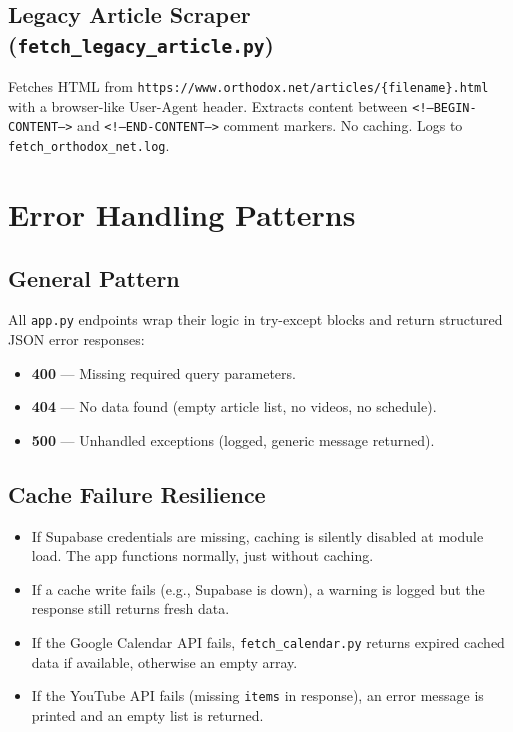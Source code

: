 \documentclass[12pt]{article}
\begin{document}
\subsection{Legacy Article Scraper (\texttt{fetch\_legacy\_article.py})}

Fetches HTML from \texttt{https://www.orthodox.net/articles/\{filename\}.html} with a browser-like User-Agent header. Extracts content between \texttt{<!--BEGIN-CONTENT-->} and \texttt{<!--END-CONTENT-->} comment markers. No caching. Logs to \texttt{fetch\_orthodox\_net.log}.

\section{Error Handling Patterns}

\subsection{General Pattern}
All \texttt{app.py} endpoints wrap their logic in try-except blocks and return structured JSON error responses:
\begin{itemize}
    \item \textbf{400} --- Missing required query parameters.
    \item \textbf{404} --- No data found (empty article list, no videos, no schedule).
    \item \textbf{500} --- Unhandled exceptions (logged, generic message returned).
\end{itemize}

\subsection{Cache Failure Resilience}
\begin{itemize}
    \item If Supabase credentials are missing, caching is silently disabled at module load. The app functions normally, just without caching.
    \item If a cache write fails (e.g., Supabase is down), a warning is logged but the response still returns fresh data.
    \item If the Google Calendar API fails, \texttt{fetch\_calendar.py} returns expired cached data if available, otherwise an empty array.
    \item If the YouTube API fails (missing \texttt{items} in response), an error message is printed and an empty list is returned.
\end{itemize}
\end{document}
